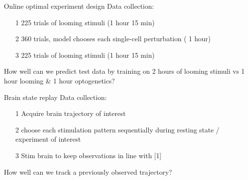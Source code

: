 \begin{frame}{ Online optimal experiment design }
    Data collection:
    \begin{itemize}
        \item [1] 225 trials of looming stimuli (1 hour 15 min)
        \item [2] 360 trials, model chooses each single-cell perturbation ( 1 hour)
        \item [3] 225 trials of looming stimuli (1 hour 15 min)
    \end{itemize}{}

    How well can we predict test data by training on 2 hours of looming stimuli vs 1 hour looming \& 1 hour optogenetics?
\end{frame}{}


\begin{frame}{ Brain state replay }
    Data collection:
    \begin{itemize}
        \item [1] Acquire brain trajectory of interest
        \item [2] choose each stimulation pattern sequentially during resting state / experiment of interest
        \item [3] Stim brain to keep observations in line with [1]
    \end{itemize}{}

    How well can we track a previously observed trajectory?

\end{frame}{}
